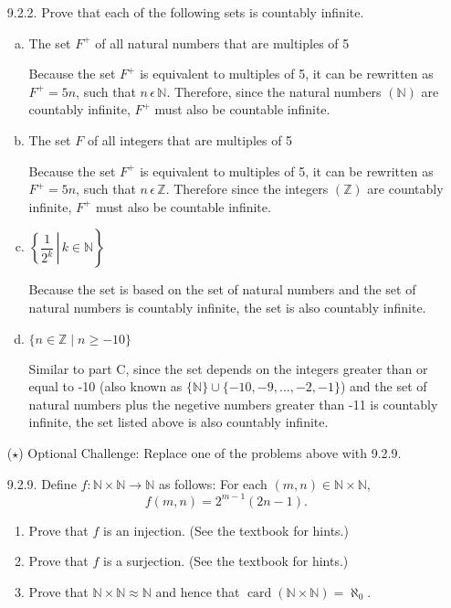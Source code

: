 \documentclass[11pt]{article}
\newcommand{\N}{\mathbb N}
\newcommand{\nat}{\mathbb N}
\newcommand{\Z}{\mathbb Z}
\DeclareMathOperator{\card}{card}
\begin{document}
\begin{itemize}
\hrulefill

\item[9.2.2.] Prove that each of the following sets is countably infinite.

\begin{enumerate}[(a)]
\item The set $F^+$ of all natural numbers that are multiples of 5
\par Because the set $F^+$ is equivalent to multiples of 5, it can be rewritten as 
$F^+ = 5n$, such that $n\,\epsilon\,\N$. Therefore, since the natural numbers $(\N)$ are countably
 infinite, $F^+$ must also be countable infinite.
\item The set $F$ of all integers that are multiples of 5
\par Because the set $F^+$ is equivalent to multiples of 5, it can be rewritten as 
$F^+ = 5n$, such that $n\,\epsilon\,\Z$. Therefore since the integers $(\Z)$ are countably infinite, 
$F^+$ must also be countable infinite.
\item $\left.\left\{\dfrac{1}{2^k}\,\right\rvert\, k\in\N\right\}$
\par Because the set is based on the set of natural numbers and the set of natural numbers is countably 
infinite, the set is also countably infinite.
\item $\{n\in\Z\mid n\ge-10\}$
\par Similar to part C, since the set depends on the integers greater than or equal to -10 
(also known as $\{\N\} \cup \{-10,-9,...,-2,-1\}$) and the set of natural numbers plus the negetive 
numbers greater than -11 is countably infinite, the set listed above is also countably infinite.
\end{enumerate}

\hrulefill

\item[($\star$)]Optional Challenge: Replace one of the problems above with 9.2.9.

\item[9.2.9.] Define $f:\nat\times\nat\to\nat$ as follows: For each $(m,n)\in\nat\times\nat$, \[f(m,n)=2^{m-1}(2n-1).\]
\begin{enumerate}

\item Prove that $f$ is an injection. (See the textbook for hints.)
\item Prove that $f$ is a surjection. (See the textbook for hints.)
\item Prove that $\nat\times\nat\approx\nat$ and hence that $\card(\nat\times\nat)=\aleph_0$.

\end{enumerate}
\end{itemize}
\end{document}
